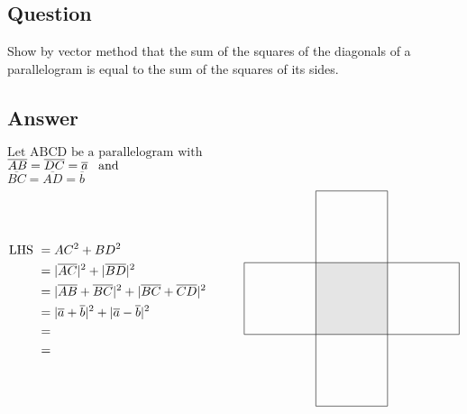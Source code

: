 \documentclass[17pt]{extarticle}
\begin{document}
\noindent
\begin{fleqn} 


\section{Question}
Show by vector method that the sum of the squares of the diagonals of a parallelogram is equal to the sum of the squares of its sides.
\subsection*{Answer}
$\text{Let ABCD be a parallelogram with }$ \\
$\overline{AB} = \overline{DC} = \overline{a} \text{\;\;\;and}$\\
$\overline{BC} = \overline{AD} = \overline{b}$\\
\begin{equation} \nonumber
\begin{alignedat}{4}
\text{LHS } &= AC^2+BD^2 \\
&= |\overline{AC}|^2 + |\overline{BD}|^2\\
&= |\overline{AB}+\overline{BC}|^2 + |\overline{BC}+\overline{CD}|^2\\
&= |\overline{a}+\overline{b}|^2 + |\overline{a}-\overline{b}|^2\\
&= \\
&= \\
\end{alignedat}
\quad\quad\quad
\begin{alignedat}{4}
\begin{tikzpicture}
\draw (0,0) -- (0,2) -- (2,2) -- (2,4) -- (4,4) -- (4,2) -- (6,2) -- (6,0) -- (4,0) -- (4,-2) -- (2,-2) -- (2,0) -- (0,0) ; 
\filldraw[fill=gray!20] (2,0) rectangle (4,2);
\end{tikzpicture}
\end{alignedat}
\end{equation}
\quad
\vspace*{-5mm}


\end{fleqn}
\end{document}
